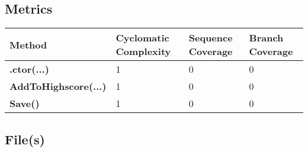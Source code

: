 \documentclass[a4paper,10pt]{article}
\begin{document}
\subsection{Metrics}
\begin{longtable}[l]{|l|l|l|l|}
\hline
\textbf{Method} & \textbf{Cyclomatic Complexity} & \textbf{Sequence Coverage} & \textbf{Branch Coverage}\\
\hline
\textbf{.ctor(...)} & 1 & 0 & 0\\
\hline
\textbf{AddToHighscore(...)} & 1 & 0 & 0\\
\hline
\textbf{Save()} & 1 & 0 & 0\\
\hline
\end{longtable}
\subsection{File(s)}
\end{document}

